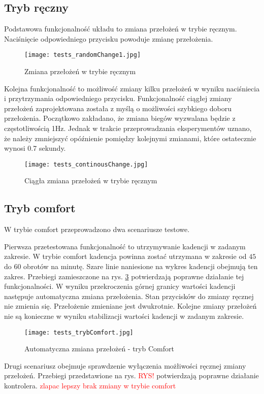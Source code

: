 \subsection{Tryb ręczny}
Podstawowa funkcjonalność układu to zmiana przełożeń w trybie ręcznym. Naciśnięcie odpowiedniego przycisku powoduje zmianę przełożenia.
 
\begin{figure}[h]
    \centering
    \texttt{[image: tests\_randomChange1.jpg]}
    \caption{Zmiana przełożeń w trybie ręcznym}
    \label{fig:tests_randomChange}
\end{figure}

Kolejna funkcjonalność to możliwość zmiany kilku przełożeń w wyniku naciśniecia i przytrzymania odpowiedniego przycisku. Funkcjonalność ciągłej zmiany przełożeń zaprojektowana została z myślą o możliwości szybkiego doboru przełożenia. Początkowo zakładano, że zmiana biegów wyzwalana będzie z częstotliwością 1Hz. Jednak w trakcie przeprowadzania eksperymentów uznano, że należy zmniejszyć opóźnienie pomiędzy kolejnymi zmianami, które ostatecznie wynosi 0.7 sekundy.

\begin{figure}[h]
    \centering
    \texttt{[image: tests\_continousChange.jpg]}
    \caption{Ciągła zmiana przełożeń w trybie ręcznym}
    \label{fig:tests_continousChange}
\end{figure}
\subsection{Tryb comfort}
W trybie comfort przeprowadzono dwa scenariusze testowe. 

Pierwsza przetestowana funkcjonalność to utrzymywanie kadencji w zadanym zakresie. W trybie comfort kadencja powinna zostać utrzymana w zakresie od $45$ do $60$ obrotów na minutę. Szare linie naniesione na wykres kadencji obejmują ten zakres. Przebiegi zamieszczone na rys. \ref{fig:tests_continousChange} potwierdzają poprawne działanie tej funkcjonalności. W wyniku przekroczenia górnej granicy wartości kadencji następuje automatyczna zmiana przełożenia. Stan przycisków do zmiany ręcznej nie zmienia się. Przełożenie zmieniane jest dwukrotnie. Kolejne zmiany przełożeń nie są konieczne w wyniku stabilizacji wartości kadencji w zadanym zakresie. 
\begin{figure}[h]
    \centering
    \texttt{[image: tests\_trybComfort.jpg]}
    \caption{Automatyczna zmiana przełożeń - tryb Comfort}
    \label{fig:tests_continousChange}
\end{figure}
Drugi scenariusz obejmuje sprawdzenie wyłączenia możłiwości ręcznej zmiany przełożeń. Przebiegi przedstawione na rys. \textcolor{red}{RYS!} potwierdzają poprawne działanie kontrolera.
\textcolor{red}{zlapac lepszy brak zmiany w trybie comfort}
